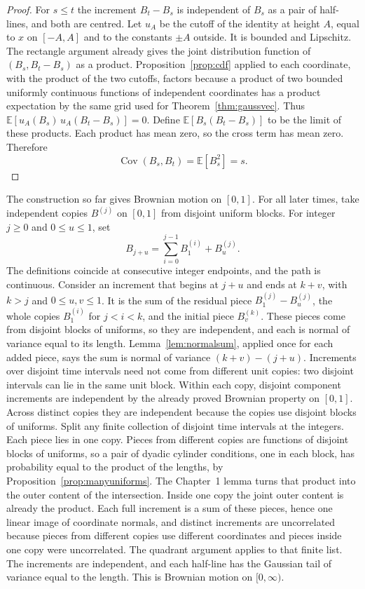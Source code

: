 \begin{proof}
For $s\le t$ the increment $B_t-B_s$ is independent of $B_s$ as a pair of half-lines, and both are centred. Let $u_A$ be the cutoff of the identity at height $A$, equal to $x$ on $[-A,A]$ and to the constants $\pm A$ outside. It is bounded and Lipschitz. The rectangle argument already gives the joint distribution function of $(B_s,B_t-B_s)$ as a product. Proposition~\ref{prop:cdf} applied to each coordinate, with the product of the two cutoffs, factors because a product of two bounded uniformly continuous functions of independent coordinates has a product expectation by the same grid used for Theorem~\ref{thm:gaussvec}. Thus $\mathbb E[u_A(B_s)\,u_A(B_t-B_s)]=0$. Define $\mathbb E[B_s(B_t-B_s)]$ to be the limit of these products. Each product has mean zero, so the cross term has mean zero. Therefore
\[
 \operatorname{Cov}(B_s,B_t)=\mathbb E[B_s^2]=s.
\]
\end{proof}

The construction so far gives Brownian motion on $[0,1]$. For all later times, take independent copies $B^{(j)}$ on $[0,1]$ from disjoint uniform blocks. For integer $j\ge0$ and $0\le u\le1$, set
\[
 B_{j+u}=\sum_{i=0}^{j-1}B^{(i)}_1+B^{(j)}_u.
\]
The definitions coincide at consecutive integer endpoints, and the path is continuous. Consider an increment that begins at $j+u$ and ends at $k+v$, with $k>j$ and $0\le u,v\le1$. It is the sum of the residual piece $B^{(j)}_1-B^{(j)}_u$, the whole copies $B^{(i)}_1$ for $j<i<k$, and the initial piece $B^{(k)}_v$. These pieces come from disjoint blocks of uniforms, so they are independent, and each is normal of variance equal to its length. Lemma~\ref{lem:normalsum}, applied once for each added piece, says the sum is normal of variance $(k+v)-(j+u)$. Increments over disjoint time intervals need not come from different unit copies: two disjoint intervals can lie in the same unit block. Within each copy, disjoint component increments are independent by the already proved Brownian property on $[0,1]$. Across distinct copies they are independent because the copies use disjoint blocks of uniforms. Split any finite collection of disjoint time intervals at the integers. Each piece lies in one copy. Pieces from different copies are functions of disjoint blocks of uniforms, so a pair of dyadic cylinder conditions, one in each block, has probability equal to the product of the lengths, by Proposition~\ref{prop:manyuniforms}. The Chapter~1 lemma turns that product into the outer content of the intersection. Inside one copy the joint outer content is already the product. Each full increment is a sum of these pieces, hence one linear image of coordinate normals, and distinct increments are uncorrelated because pieces from different copies use different coordinates and pieces inside one copy were uncorrelated. The quadrant argument applies to that finite list. The increments are independent, and each half-line has the Gaussian tail of variance equal to the length. This is Brownian motion on $[0,\infty)$.

